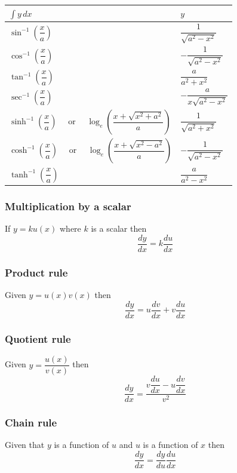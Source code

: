 \begin{center}
	\begin{tabular*}{0.75\columnwidth}{@{\extracolsep{\fill}} ll }
  		\toprule \toprule
    $\displaystyle \int y \, dx$ & $y$\\
    \midrule
		$\sin^{-1}\left(\dfrac{x}{a}\right)$ & $\dfrac{1}{\sqrt{a^2-x^2}}$ \\
		$\cos^{-1}\left(\dfrac{x}{a}\right)$ & $-\dfrac{1}{\sqrt{a^2-x^2}}$ \\
		$\tan^{-1}\left(\dfrac{x}{a}\right)$ & $\dfrac{a}{a^2+x^2}$ \\
		$\sec^{-1}\left(\dfrac{x}{a}\right)$ & $-\dfrac{a}{x\sqrt{a^2-x^2}}$ \\
		$\sinh^{-1}\left(\dfrac{x}{a}\right) \quad$ or $\quad \log_e \left( \dfrac{x + \sqrt{x^2 + a^2}}{a} \right)$ & $\dfrac{1}{\sqrt{a^2+x^2}}$ \\	
		$\cosh^{-1}\left(\dfrac{x}{a}\right) \quad$ or $\quad \log_e \left( \dfrac{x + \sqrt{x^2 - a^2}}{a} \right)$& $-\dfrac{1}{\sqrt{a^2-x^2}}$ \\	
		$\tanh^{-1}\left(\dfrac{x}{a}\right)$ & $\dfrac{a}{a^2-x^2}$ \\
    \bottomrule  \bottomrule
  \end{tabular*}
\end{center}

\subsubsection*{Multiplication by a scalar}
If $y = ku(x)$ where $k$ is a scalar then
$$\dfrac{dy}{dx} = k\dfrac{du}{dx}$$

\subsubsection*{Product rule}
Given $y = u(x)v(x)$ then
$$\dfrac{dy}{dx} = u\dfrac{dv}{dx} + v\dfrac{du}{dx} $$

\subsubsection*{Quotient rule}
Given $y=\dfrac{u(x)}{v(x)}$ then
$$\dfrac{dy}{dx} = \dfrac{v\dfrac{du}{dx} - u\dfrac{dv}{dx}}{v^2}$$

\subsubsection*{Chain rule}
Given that $y$ is a function of $u$ and $u$ is a function of $x$ then
$$\dfrac{dy}{dx} = \dfrac{dy}{du} \dfrac{du}{dx}$$

